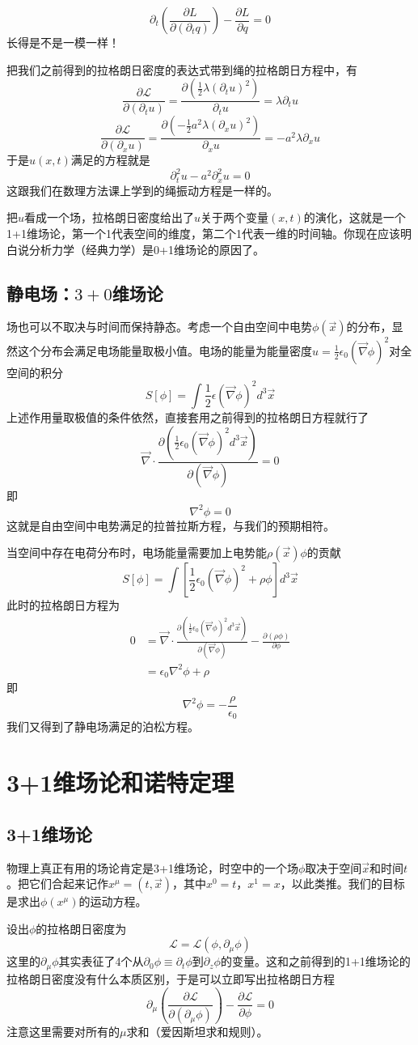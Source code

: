 \documentclass[a4paper,11pt]{ctexart}
\newcommand{\beq}{\begin{equation}}
\newcommand{\eeq}{\end{equation}}
\newcommand{\bea}{\begin{equation}\begin{aligned}}
\newcommand{\eea}{\end{aligned}\end{equation}}
\newcommand{\lag}{\mathcal{L}}
\begin{document}
\beq
\partial_t(\frac{\partial L}{\partial (\partial_t q)}) - \frac{\partial L}{\partial q} = 0
\eeq
长得是不是一模一样！
\par
把我们之前得到的拉格朗日密度的表达式带到绳的拉格朗日方程中，有
\beq
\frac{\partial \lag}{\partial ({\partial_t u})} = \frac{\partial (\frac{1}{2}\lambda (\partial_t u)^2)}{\partial_t u}= \lambda \partial_t u
\eeq
\beq
\frac{\partial \lag}{\partial ({\partial_x u})} = \frac{\partial (-\frac{1}{2}a^2\lambda (\partial_x u)^2)}{\partial_x u} = -a^2 \lambda \partial_x u
\eeq
于是$u(x,t)$满足的方程就是
\beq
\partial_t^2 u - a^2 \partial_x^2 u = 0
\eeq
这跟我们在数理方法课上学到的绳振动方程是一样的。
\par
把$u$看成一个场，拉格朗日密度给出了$u$关于两个变量$(x,t)$的演化，这就是一个1+1维场论，第一个1代表空间的维度，第二个1代表一维的时间轴。你现在应该明白说分析力学（经典力学）是0+1维场论的原因了。
\subsection{静电场：$3+0$维场论}
场也可以不取决与时间而保持静态。考虑一个自由空间中电势$\phi(\vec{x})$的分布，显然这个分布会满足电场能量取极小值。电场的能量为能量密度$u = \frac{1}{2}\epsilon_0 (\vec{\nabla} \phi)^2$对全空间的积分
\beq
S[\phi] =\int \frac{1}{2}\epsilon (\vec{\nabla} \phi)^2 d^3 \vec{x}
\eeq
上述作用量取极值的条件依然，直接套用之前得到的拉格朗日方程就行了
\beq
\vec{\nabla} \cdot \frac{\partial (\frac{1}{2}\epsilon_0 (\vec{\nabla} \phi)^2 d^3 \vec{x})}{\partial (\vec{\nabla} \phi)} = 0
\eeq
即
\beq
\nabla^2 \phi = 0
\eeq
这就是自由空间中电势满足的拉普拉斯方程，与我们的预期相符。
\par
当空间中存在电荷分布时，电场能量需要加上电势能$\rho(\vec{x}) \phi$的贡献
\beq
S[\phi] =\int [\frac{1}{2}\epsilon_0 (\vec{\nabla} \phi)^2 + \rho \phi] d^3 \vec{x}
\eeq
此时的拉格朗日方程为
\bea
0 &= \vec{\nabla} \cdot \frac{\partial (\frac{1}{2}\epsilon_0 (\vec{\nabla} \phi)^2 d^3 \vec{x})}{\partial (\vec{\nabla} \phi)} - \frac{\partial (\rho \phi)}{\partial \phi} \\
&=\epsilon_0 \nabla^2 \phi + \rho
\eea
即
\beq
\nabla^2 \phi = -\frac{\rho}{\epsilon_0}
\eeq
我们又得到了静电场满足的泊松方程。

\section{3+1维场论和诺特定理}
\subsection{3+1维场论}
物理上真正有用的场论肯定是3+1维场论，时空中的一个场$\phi$取决于空间$\vec{x}$和时间$t$。把它们合起来记作$x^\mu = (t,\vec{x})$，其中$x^0 = t$，$x^1 = x$，以此类推。我们的目标是求出$\phi(x^\mu)$的运动方程。
\par
设出$\phi$的拉格朗日密度为
\beq
\lag = \lag(\phi,\partial_\mu \phi)
\eeq
这里的$\partial_\mu \phi$其实表征了4个从$\partial_0 \phi \equiv \partial_t \phi$到$\partial_z \phi$的变量。这和之前得到的1+1维场论的拉格朗日密度没有什么本质区别，于是可以立即写出拉格朗日方程
\beq
\partial_\mu (\frac{\partial \lag}{\partial (\partial_\mu \phi)}) - \frac{\partial \lag}{\partial \phi} = 0
\eeq
注意这里需要对所有的$\mu$求和（爱因斯坦求和规则）。
\end{document}
